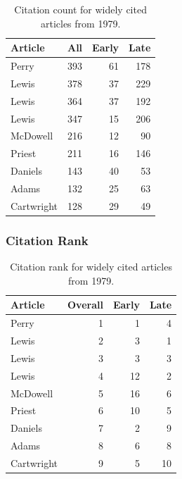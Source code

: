 \documentclass[
  10pt,
  letterpaper,
  DIV=11,
  numbers=noendperiod,
  twoside]{scrartcl}
\begin{document}
\begin{longtable}[]{@{}lrrr@{}}

\caption{\label{tbl-citation-count-1979}Citation count for widely cited
articles from 1979.}

\tabularnewline

\toprule\noalign{}
Article & All & Early & Late \\
\midrule\noalign{}
\endhead
\bottomrule\noalign{}
\endlastfoot
Perry & 393 & 61 & 178 \\
Lewis & 378 & 37 & 229 \\
Lewis & 364 & 37 & 192 \\
Lewis & 347 & 15 & 206 \\
McDowell & 216 & 12 & 90 \\
Priest & 211 & 16 & 146 \\
Daniels & 143 & 40 & 53 \\
Adams & 132 & 25 & 63 \\
Cartwright & 128 & 29 & 49 \\

\end{longtable}

\subsubsection*{Citation Rank}\label{sec-rank-1979}

\begin{longtable}[]{@{}lrrr@{}}

\caption{\label{tbl-citation-rank-1979}Citation rank for widely cited
articles from 1979.}

\tabularnewline

\toprule\noalign{}
Article & Overall & Early & Late \\
\midrule\noalign{}
\endhead
\bottomrule\noalign{}
\endlastfoot
Perry & 1 & 1 & 4 \\
Lewis & 2 & 3 & 1 \\
Lewis & 3 & 3 & 3 \\
Lewis & 4 & 12 & 2 \\
McDowell & 5 & 16 & 6 \\
Priest & 6 & 10 & 5 \\
Daniels & 7 & 2 & 9 \\
Adams & 8 & 6 & 8 \\
Cartwright & 9 & 5 & 10 \\

\end{longtable}
\end{document}

